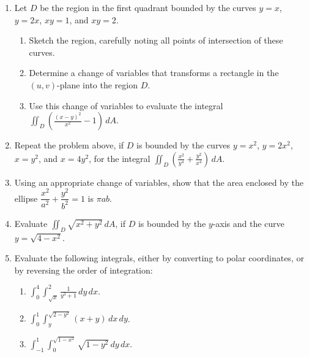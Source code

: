 \documentclass[letterpaper,12pt]{article}
\newcommand{\di}{\displaystyle}
\begin{document}
\begin{enumerate}
\item Let $D$ be the region in the first quadrant bounded by the curves $y=x$, $y=2x$, $xy=1$, and $xy=2$.
\begin{enumerate}
\item Sketch the region, carefully noting all points of intersection of these curves.
\item Determine a change of variables that transforms a rectangle in the $(u,v)$-plane into the region $D$.
\item Use this change of variables to evaluate the integral $\di \iint_D\left(\frac{(x-y)^2}{x^2}-1\right)\,dA$.
\end{enumerate}
\item Repeat the problem above, if $D$ is bounded by the curves $y=x^2$, $y=2x^2$, $x=y^2$, and $x=4y^2$, for the integral $\di \iint_D\left(\frac{x^2}{y^4}+\frac{y^2}{x^4}\right)\,dA$.
\item Using an appropriate change of variables, show that the area enclosed by the ellipse $\dfrac{x^2}{a^2}+\dfrac{y^2}{b^2}=1$ is $\pi ab$.
\item Evaluate $\iint_D \sqrt{x^2+y^2}\,dA$, if $D$ is bounded by the $y$-axis and the curve $y=\sqrt{4-x^2}$.
\item Evaluate the following integrals, either by converting to polar coordinates, or by reversing the order of integration:
\begin{enumerate}
\item $\di \int_0^4\int_{\sqrt{x}}^2 \frac{1}{y^3+1}\,dy\,dx$.
\item $\di \int_0^1\int_y^{\sqrt{2-y^2}}(x+y)\,dx\,dy$.
\item $\di \int_{-1}^1\int_0^{\sqrt{1-x^2}}\sqrt{1-y^2}\,dy\,dx$.
\end{enumerate}
\end{enumerate}
\end{document}
